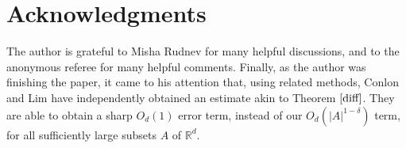 \section*{Acknowledgments} %
The author is grateful to Misha Rudnev for many helpful discussions, and to the anonymous referee for many helpful comments. Finally, as the author was finishing the paper, it came to his attention that, using related methods, Conlon and Lim \cite{CL2021} have independently obtained an estimate akin to Theorem $\ref{diff}$. They are able to obtain a sharp $O_{d}(1)$ error term, instead of our $O_{d}(|A|^{1- \delta})$ term, for all sufficiently large subsets $A$ of $\mathbb{R}^d$.
